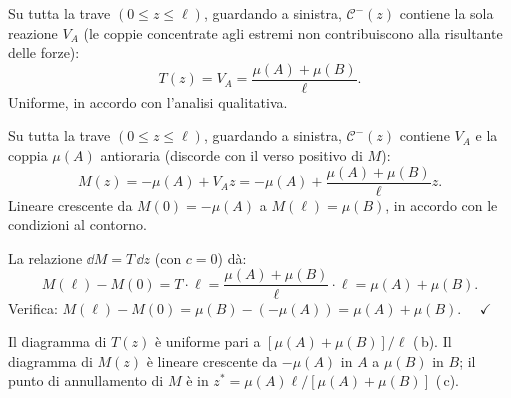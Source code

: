 \begin{esempio}
\begin{svolgimento}
		
		Su tutta la trave $(0 \leq z \leq \ell)$,
		guardando a sinistra, $\mathcal{C}^-(z)$ contiene
		la sola reazione $V_A$ (le coppie concentrate
		agli estremi non contribuiscono alla risultante
		delle forze):
		\[
		T(z) = V_A = \frac{\mu(A)+\mu(B)}{\ell}.
		\]
		Uniforme, in accordo con l'analisi qualitativa.
		
		
		Su tutta la trave $(0 \leq z \leq \ell)$,
		guardando a sinistra, $\mathcal{C}^-(z)$ contiene
		$V_A$ e la coppia $\mu(A)$ antioraria (discorde
		con il verso positivo di $M$):
		\[
		M(z) = -\mu(A) + V_A z
		= -\mu(A) + \frac{\mu(A)+\mu(B)}{\ell}z.
		\]
		Lineare crescente da $M(0) = -\mu(A)$ a
		$M(\ell) = \mu(B)$, in accordo con le condizioni
		al contorno.
		
		La relazione $\dd M = T\,\dd z$ (con $c = 0$) dà:
		\[
		M(\ell) - M(0) = T \cdot \ell
		= \frac{\mu(A)+\mu(B)}{\ell}\cdot\ell
		= \mu(A)+\mu(B).
		\]
		Verifica: $M(\ell) - M(0) = \mu(B) -(-\mu(A))
		= \mu(A)+\mu(B)$. $\quad\checkmark$
		
		\noindent
		Il diagramma di $T(z)$ è uniforme pari a
		$[\mu(A)+\mu(B)]/\ell$ (\,b).
		Il diagramma di $M(z)$ è lineare crescente
		da $-\mu(A)$ in $A$ a $\mu(B)$ in $B$;
		il punto di annullamento di $M$ è in
		$z^* = \mu(A)\ell/[\mu(A)+\mu(B)]$ (\,c).
		
	\end{svolgimento}
\end{esempio}


